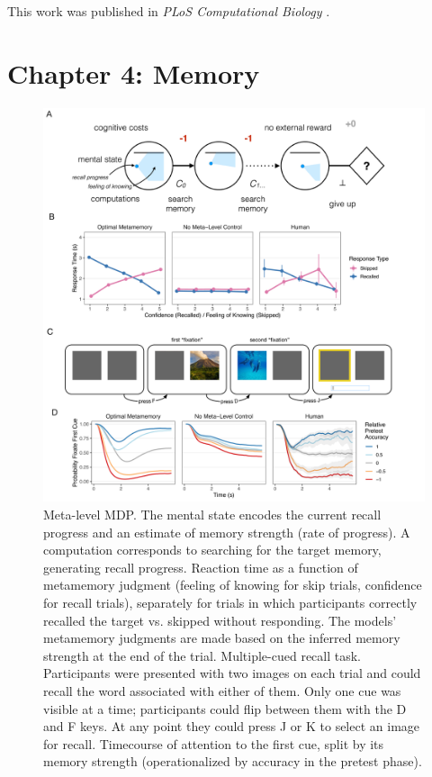 \documentclass[dsingle]{memo}
\begin{document}
This work was published in \emph{PLoS Computational Biology} \citep{callaway2021fixation}.

\section{Chapter 4: Memory}

\begin{figure}[ph]
  \centering
  \includegraphics[width=\textwidth]{diagrams/precis/memory.pdf}
  \caption{
     Meta-level MDP. The mental state encodes the current recall progress and an estimate of memory strength (rate of progress). A computation corresponds to searching for the target memory, generating recall progress.
     Reaction time as a function of metamemory judgment (feeling of knowing for skip trials, confidence for recall trials), separately for trials in which participants correctly recalled the target vs. skipped without responding. The models' metamemory judgments are made based on the inferred memory strength at the end of the trial.
     Multiple-cued recall task. Participants were presented with two images on each trial and could recall the word associated with either of them. Only one cue was visible at a time; participants could flip between them with the D and F keys. At any point they could press J or K to select an image for recall.
     Timecourse of attention to the first cue, split by its memory strength (operationalized by accuracy in the pretest phase).
  }
  \label{fig:memory}
\end{figure}
\end{document}
